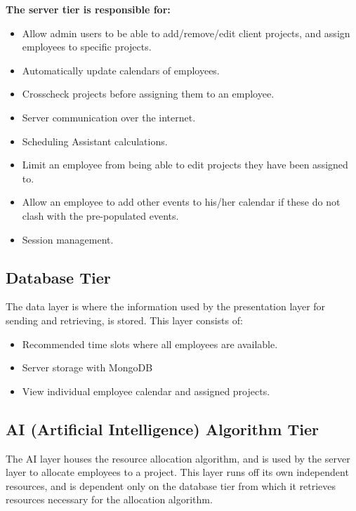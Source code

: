 \documentclass[a4paper,12pt]{article}
\begin{document}
\begin{adjustwidth}{2.5em}{0pt}
\begin{flushleft}
			\textbf{The server tier is responsible for:}
			\begin{itemize}
				\item Allow admin users to be able to add/remove/edit client projects, and assign employees to specific projects.
				\item Automatically update calendars of employees.
				\item Crosscheck projects before assigning them to an employee.
				\item Server communication over the internet.
				\item Scheduling Assistant calculations. 
				\item Limit an employee from being able to edit projects they have been assigned to.
				\item Allow an employee to add other events to his/her calendar if these do not clash with the pre-populated events.
				\item Session management.
			\end{itemize}
			\end{flushleft}
			
			\newpage
			\subsection{Database Tier}
			\begin{flushleft}
				The data layer is where the information used by the presentation layer for sending and retrieving, is stored. This layer consists of:
				\begin{itemize}
					\item Recommended time slots where all employees are available. 
					\item Server storage with MongoDB
					\item View individual employee calendar and assigned projects. 
				\end{itemize}
			\end{flushleft}
		
			
			\subsection{AI (Artificial Intelligence) Algorithm Tier}
			\begin{flushleft}
			    The AI layer houses the resource allocation algorithm, and is used by the server layer to allocate employees to a project. This layer runs off its own independent resources, and is dependent only on the database tier from which it retrieves resources necessary for the allocation algorithm.
			  
			\end{flushleft}
	\end{adjustwidth}
	
\end{document}
